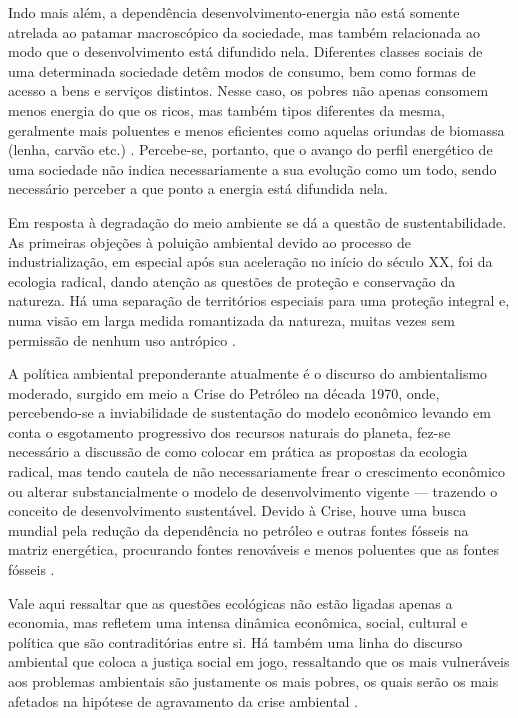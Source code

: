 Indo mais além, a dependência desenvolvimento-energia não está somente atrelada
ao patamar macroscópico da sociedade, mas também relacionada ao modo que o
desenvolvimento está difundido nela. Diferentes classes sociais de uma
determinada sociedade detêm modos de consumo, bem como formas de acesso a bens e
serviços distintos. Nesse caso, os pobres não apenas consomem menos
energia do que os ricos, mas também tipos diferentes da mesma, geralmente mais
poluentes e menos eficientes como aquelas oriundas de biomassa (lenha, carvão
etc.) \cite{rippel}. Percebe-se, portanto, que o avanço do perfil energético de
uma sociedade não indica necessariamente a sua evolução como um todo, sendo
necessário perceber a que ponto a energia está difundida nela.

Em resposta à degradação do meio ambiente se dá a questão de
sustentabilidade. As primeiras objeções à poluição ambiental devido ao processo 
de industrialização, em especial após sua aceleração no início do século XX,
foi da ecologia radical, dando atenção as questões de proteção e conservação da natureza.
Há uma separação de territórios especiais para uma proteção integral e, numa
visão em larga medida romantizada da natureza, muitas vezes sem permissão 
de nenhum uso antrópico \cite{jatoba}.

A política ambiental preponderante atualmente é o discurso do ambientalismo moderado, 
surgido em meio a Crise do Petróleo na década 1970, onde, percebendo-se a
inviabilidade de sustentação do modelo econômico levando em conta o esgotamento
progressivo dos recursos naturais do planeta, fez-se necessário a discussão de como 
colocar em prática as propostas da ecologia radical, mas tendo cautela de não 
necessariamente frear o crescimento econômico ou alterar substancialmente o 
modelo de desenvolvimento vigente --- trazendo o conceito de desenvolvimento
sustentável. Devido à Crise, houve uma busca mundial pela redução da 
dependência no petróleo e outras fontes fósseis na matriz energética, 
procurando fontes renováveis e menos poluentes que as fontes fósseis 
\cite{jatoba,epe_eficiencia_2012,rippel}. 

Vale aqui ressaltar que as questões ecológicas não estão ligadas apenas a
economia, mas refletem uma intensa dinâmica econômica, social, cultural e política 
que são contraditórias entre si. Há também uma linha do discurso ambiental que coloca a
justiça social em jogo, ressaltando que os mais vulneráveis aos problemas
ambientais são justamente os mais pobres, os quais serão os mais afetados na
hipótese de agravamento da crise ambiental \cite{jatoba}.


